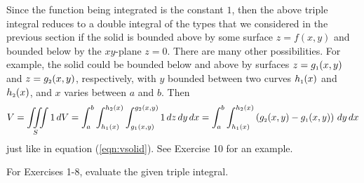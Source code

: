 Since the function being integrated is the constant $1$, then the above triple integral reduces to a double integral of
the types that we considered in the previous section if the solid is bounded above by some surface $z=f(x,y)$ and
bounded below by the $xy$-plane $z=0$. There are many other possibilities. For example, the solid could be bounded
below and above by surfaces $z=g_{\scriptscriptstyle 1}(x,y)$ and $z=g_{\scriptscriptstyle 2}(x,y)$, respectively, with $y$ bounded between
two curves $h_{\scriptscriptstyle 1}(x)$ and $h_{\scriptscriptstyle 2}(x)$, and $x$ varies between $a$ and $b$. Then
\begin{displaymath}
 V = \iiint\limits_{S} 1\,dV =
  \int_{a}^{b} \int_{h_{\scriptscriptstyle 1}(x)}^{h_{\scriptscriptstyle 2}(x)} \int_{g_{\scriptscriptstyle 1}(x,y)}^{g_{\scriptscriptstyle 2}(x,y)} 1\,dz\,dy\,dx =
  \int_{a}^{b} \int_{h_{\scriptscriptstyle 1}(x)}^{h_{\scriptscriptstyle 2}(x)} \left( g_{\scriptscriptstyle 2}(x,y) - g_{\scriptscriptstyle 1}(x,y) \right) \,dy\,dx
\end{displaymath}
just like in equation (\ref{eqn:vsolid}). See Exercise 10 for an example.
\startexercises\label{sec3dot3}
\par\noindent For Exercises 1-8, evaluate the given triple integral.
